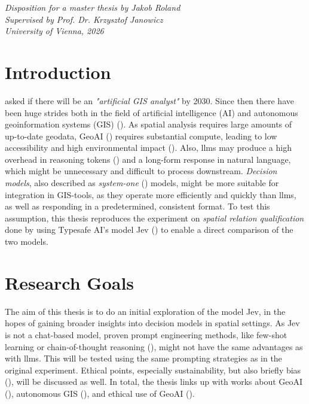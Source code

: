 




\maketitle
\textit{Disposition for a master thesis by Jakob Roland}\\
\textit{Supervised by Prof. Dr. Krzysztof Janowicz}\\
\textit{University of Vienna, 2026}

\section*{Introduction}
\cite{janowiczGeoAISpatiallyExplicit2020} asked if there will be an \textit{"artificial GIS analyst"} by 2030. Since then there have been huge strides both in the field of artificial intelligence (AI) and autonomous geoinformation systems (GIS) (\cite{liGIScienceEraArtificial2025}). As spatial analysis requires large amounts of up-to-date geodata, GeoAI (\cite{janowiczGeoAISpatiallyExplicit2020}) requires substantial compute, leading to low accessibility and high environmental impact (\cite{janowiczPhilosophicalFoundationsGeoAI2023, shiGeographyAISustainability2025}). Also, \acrfull{llms} may produce a high overhead in reasoning tokens (\cite{wangTruncatedReasoningBudget2026,chenNOTThinkThat2025}) and a long-form response in natural language, which might be unnecessary and difficult to process downstream. \textit{Decision models}, also described as \textit{system-one} (\cite{kahnemanThinkingFastSlow2011}) models, might be more suitable for integration in GIS-tools, as they operate more efficiently and quickly than \acrshort{llms}, as well as responding in a predetermined, consistent format. To test this assumption, this thesis reproduces the experiment on \textit{spatial relation qualification} done by \cite{jiFoundationModelsGeospatial2025} using Typesafe AI's model Jev (\cite{IntroducingSystemOne}) to enable a direct comparison of the two models.

\section*{Research Goals}
The aim of this thesis is to do an initial exploration of the model Jev, in the hopes of gaining broader insights into decision models in spatial settings. As Jev is not a chat-based model, proven prompt engineering methods, like few-shot learning or chain-of-thought reasoning (\cite{schulhoffPromptReportSystematic2025}), might not have the same advantages as with \acrshort{llms}. This will be tested using the same prompting strategies as in the original experiment. Ethical points, especially sustainability, but also briefly bias (\cite{aldahoulJevDecisionModel2026}), will be discussed as well. In total, the thesis links up with works about GeoAI (\cite{jiFoundationModelsGeospatial2025,janowiczGeoAISpatiallyExplicit2020}), autonomous GIS (\cite{liGIScienceEraArtificial2025}), and ethical use of GeoAI (\cite{shiGeographyAISustainability2025, janowiczPhilosophicalFoundationsGeoAI2023}). 
\newpage

